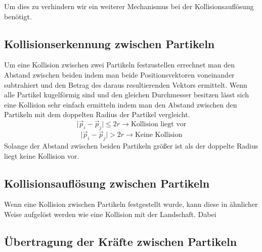 \begin{Spacing}{\mylinespace}
		Um dies zu verhindern wir ein weiterer Mechanismus bei der Kollisionsauflösung benötigt.



    \subsection{Kollisionserkennung zwischen Partikeln}
    	Um eine Kollision zwischen zwei Partikeln festzustellen errechnet man
    	den Abstand zwischen beiden indem man beide Positionsvektoren voneinander
    	subtrahiert und den Betrag des daraus resultierenden Vektors ermittelt.
    	Wenn alle Partikel kugelförmig sind und den gleichen Durchmesser besitzen
    	lässt sich eine Kollision sehr einfach ermitteln indem man den Abstand
    	zwischen den Partikeln mit dem doppelten Radius der Partikel vergleicht.
    	\[ \vert \vec{p}_{i} - \vec{p}_{j} \vert \leq 2r \rightarrow \textrm{Kollision liegt vor} \]
    	\[ \vert \vec{p}_{i} - \vec{p}_{j} \vert > 2r \rightarrow \textrm{Keine Kollision} \]
    	Solange der Abstand zwischen beiden Partikeln größer ist als der
    	doppelte Radius liegt keine Kollision vor.
    \subsection{Kollisionsauflösung zwischen Partikeln}
    	Wenn eine Kollision zwischen Partikeln festgestellt wurde, kann diese in
    	ähnlicher Weise aufgelöst werden wie eine Kollision mit der Landschaft.
    	Dabei 
    \subsection{Übertragung der Kräfte zwischen Partikeln}
\end{Spacing}
\newpage
\clearpage
